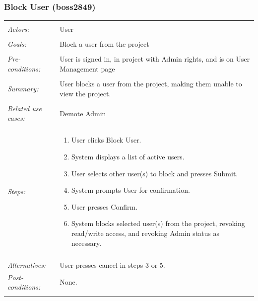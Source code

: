 \documentclass[11pt]{article}
\begin{document}
\subsubsection{Block User (boss2849)}
\begin{tabular}{ p{2cm} p{12cm} }
 \hline
 \\
 \textit{Actors:} & User \\ 
 \\
 \textit{Goals:} & Block a user from the project \\
 \\
 \textit{Pre-conditions:} & User is signed in, in project with Admin rights, and is on User Management page \\
 \\
 \textit{Summary:} & User blocks a user from the project, making them unable to view the project. \\ 
 \\
 \textit{Related use cases:} & Demote Admin \\ 
 \\
 \textit{Steps:} & \begin{enumerate}
  \item User clicks Block User.
  \item System displays a list of active users.
  \item User selects other user(s) to block and presses Submit.
  \item System prompts User for confirmation.
  \item User presses Confirm.
  \item System blocks selected user(s) from the project, revoking read/write access, and revoking Admin status as necessary.
 \end{enumerate} \\
 \\
 \textit{Alternatives:} & User presses cancel in steps 3 or 5.
 \\
 \textit{Post-conditions:} & None. \\
 \\
\hline
\end{tabular}
\end{document}

